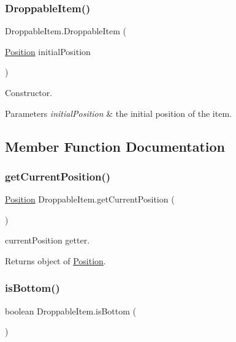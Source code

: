 \subsubsection{\texorpdfstring{Droppable\+Item()}{DroppableItem()}}
{\footnotesize\ttfamily Droppable\+Item.\+Droppable\+Item (\begin{DoxyParamCaption}\item[{\mbox{\hyperlink{class_position}{Position}}}]{initial\+Position }\end{DoxyParamCaption})\hspace{0.3cm}{\ttfamily [inline]}}

Constructor. 
\begin{DoxyParams}{Parameters}
{\em initial\+Position} & the initial position of the item. \\
\hline
\end{DoxyParams}


\subsection{Member Function Documentation}
\mbox{\label{class_droppable_item_a90d927cd4460d9cd5e0070b000606cd3}} 
\subsubsection{\texorpdfstring{get\+Current\+Position()}{getCurrentPosition()}}
{\footnotesize\ttfamily \mbox{\hyperlink{class_position}{Position}} Droppable\+Item.\+get\+Current\+Position (\begin{DoxyParamCaption}{ }\end{DoxyParamCaption})\hspace{0.3cm}{\ttfamily [inline]}}

current\+Position getter. \begin{DoxyReturn}{Returns}
object of \mbox{\hyperlink{class_position}{Position}}. 
\end{DoxyReturn}
\mbox{\label{class_droppable_item_a5cbe880513fffe6c70678bd3b86ca934}} 
\subsubsection{\texorpdfstring{is\+Bottom()}{isBottom()}}
{\footnotesize\ttfamily boolean Droppable\+Item.\+is\+Bottom (\begin{DoxyParamCaption}{ }\end{DoxyParamCaption})\hspace{0.3cm}{\ttfamily [inline]}}

